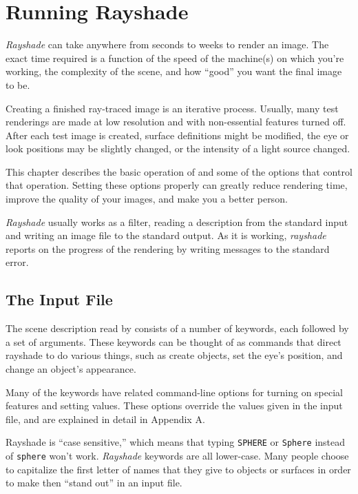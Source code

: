 \chapter{Running Rayshade}

{\em Rayshade}
can take anywhere from seconds to weeks to render an image.  The exact
time required is a function of the speed of the
machine(s) on which
you're working, the complexity of the scene, and how ``good'' you want
the final image to be.

Creating a finished ray-traced image is an iterative process.  Usually, many
test renderings are made at low resolution and with
non-essential features turned off.  After each test image is created,
surface definitions might be modified, the eye or look positions may be
slightly changed, or the intensity of a light source changed.

This chapter describes the basic operation of \rayshade and some of
the options that control that operation.
Setting these options properly can greatly reduce
rendering time, improve the quality of your images, and make you a better
person.

{\em Rayshade} usually works as a filter, reading a description from
the standard input and writing
an image file to the standard output.  As it is working, {\em rayshade} reports
on the progress of the rendering by writing messages to the standard
error.

\section{The Input File}

The scene description read by \rayshade consists of a number of
keywords, each followed by a set of arguments.  These keywords can
be thought of as commands that direct rayshade to do various things,
such as create objects, set the eye's position, and change an object's
appearance.

Many of the keywords have related command-line options for turning
on special features and setting values.
These options override the values given in the input file,
and are explained in detail in Appendix A.

Rayshade is ``case sensitive,'' which means that typing
{\tt SPHERE} or {\tt Sphere} instead of {\tt sphere} won't work.
{\em Rayshade} keywords are all lower-case.  Many people choose to
capitalize the first letter of names that they give to objects
or surfaces in order to make then ``stand out'' in an input file.

